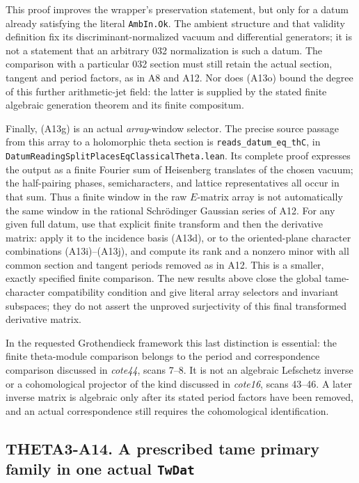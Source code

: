 \documentclass[11pt]{article}
\theoremstyle{definition}\newtheorem{definition}[theorem]{Definition}\newtheorem{remark}[theorem]{Remark}
\begin{document}
This proof improves the wrapper's preservation statement,
but only for a datum already satisfying the literal
\texttt{AmbIn.Ok}.  The ambient structure and that validity definition fix its
discriminant-normalized vacuum and differential generators;
it is not a statement that an arbitrary 032 normalization
is such a datum.  The comparison with a particular 032
section must still retain the actual section, tangent
and period factors, as in A8 and A12.  Nor does (A13o)
bound the degree of this further arithmetic-jet field:
the latter is supplied by the stated finite algebraic
generation theorem and its finite compositum.

Finally, (A13g) is an actual \emph{array}-window selector.
The precise source passage from this array to a holomorphic
theta section is \texttt{reads\_datum\_eq\_thC}, in
\nolinkurl{DatumReadingSplitPlacesEqClassicalTheta.lean}.
Its complete proof expresses the output as a finite
Fourier sum of Heisenberg translates of the chosen vacuum;
the half-pairing phases, semicharacters, and lattice
representatives all occur in that sum.  Thus a finite
window in the raw $E$-matrix array is not automatically
the same window in the rational Schr\"odinger Gaussian
series of A12.  For any given full datum, use that explicit
finite transform and then the derivative matrix: apply it
to the incidence basis (A13d), or to the oriented-plane
character combinations (A13i)--(A13j), and compute its rank
and a nonzero minor with all common section and tangent
periods removed as in A12.  This is a smaller, exactly
specified finite comparison.  The new results above close
the global tame-character compatibility condition and
give literal array selectors and invariant subspaces;
they do not assert the unproved surjectivity of this
final transformed derivative matrix.

In the requested Grothendieck framework this last distinction
is essential: the finite theta-module comparison belongs
to the period and correspondence comparison discussed in
\emph{cote44}, scans 7--8.  It is not an algebraic Lefschetz
inverse or a cohomological projector of the kind discussed
in \emph{cote16}, scans 43--46.  A later inverse matrix is
algebraic only after its stated period factors have been
removed, and an actual correspondence still requires the
cohomological identification.


\subsection{THETA3-A14. A prescribed tame primary family in one actual \texttt{TwDat}}
\label{A14}
\end{document}
